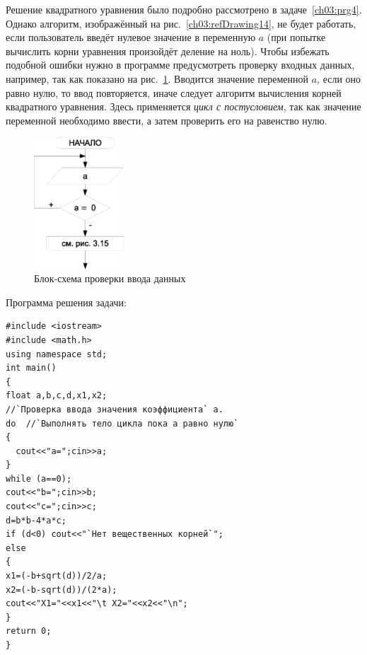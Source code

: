 
Решение квадратного уравнения было подробно рассмотрено в задаче~\ref{ch03:prg4}. Однако алгоритм, изображённый 
на рис.~\ref{ch03:refDrawing14}, не будет работать, если пользователь введёт нулевое значение в переменную $a$ (при
попытке вычислить корни уравнения произойдёт деление на ноль). Чтобы избежать подобной ошибки нужно в программе
предусмотреть проверку входных данных, например, так как показано на рис.~\ref{ch03:refDrawing26}. 
Вводится значение переменной
$a$, если оно равно нулю, то ввод повторяется, иначе следует алгоритм вычисления корней квадратного
уравнения. Здесь применяется \emph{цикл с постусловием}, так как значение переменной необходимо ввести, а
затем проверить его на равенство нулю.

\begin{figure}[htb]
\begin{center}
\includegraphics[width=0.3\textwidth]{img/ris_3_27}
\caption{Блок-схема проверки ввода данных}
\label{ch03:refDrawing26}
\end{center}
\end{figure}

Программа решения задачи:
\begin{lstlisting}
#include <iostream>
#include <math.h>
using namespace std;
int main()
{
float a,b,c,d,x1,x2;
//`Проверка ввода значения коэффициента` a.
do  //`Выполнять тело цикла пока а равно нулю`
{
  cout<<"a=";cin>>a;
}
while (a==0);
cout<<"b=";cin>>b;
cout<<"c=";cin>>c;
d=b*b-4*a*c;
if (d<0) cout<<"`Нет вещественных корней`";
else
{
x1=(-b+sqrt(d))/2/a;
x2=(-b-sqrt(d))/(2*a);
cout<<"X1="<<x1<<"\t X2="<<x2<<"\n";
}
return 0;
}
\end{lstlisting}


